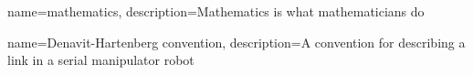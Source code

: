 \makeglossaries
 
 
{
    name=mathematics,
    description={Mathematics is what mathematicians do}
}

{
    name={Denavit-Hartenberg convention},
    description={A convention for describing a link in a serial manipulator robot}
}